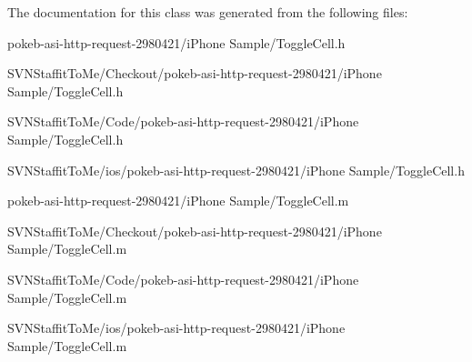 \-The documentation for this class was generated from the following files\-:\begin{DoxyCompactItemize}
\item 
pokeb-\/asi-\/http-\/request-\/2980421/i\-Phone Sample/\-Toggle\-Cell.\-h\item 
\-S\-V\-N\-Staffit\-To\-Me/\-Checkout/pokeb-\/asi-\/http-\/request-\/2980421/i\-Phone Sample/\-Toggle\-Cell.\-h\item 
\-S\-V\-N\-Staffit\-To\-Me/\-Code/pokeb-\/asi-\/http-\/request-\/2980421/i\-Phone Sample/\-Toggle\-Cell.\-h\item 
\-S\-V\-N\-Staffit\-To\-Me/ios/pokeb-\/asi-\/http-\/request-\/2980421/i\-Phone Sample/\-Toggle\-Cell.\-h\item 
pokeb-\/asi-\/http-\/request-\/2980421/i\-Phone Sample/\-Toggle\-Cell.\-m\item 
\-S\-V\-N\-Staffit\-To\-Me/\-Checkout/pokeb-\/asi-\/http-\/request-\/2980421/i\-Phone Sample/\-Toggle\-Cell.\-m\item 
\-S\-V\-N\-Staffit\-To\-Me/\-Code/pokeb-\/asi-\/http-\/request-\/2980421/i\-Phone Sample/\-Toggle\-Cell.\-m\item 
\-S\-V\-N\-Staffit\-To\-Me/ios/pokeb-\/asi-\/http-\/request-\/2980421/i\-Phone Sample/\-Toggle\-Cell.\-m\end{DoxyCompactItemize}
